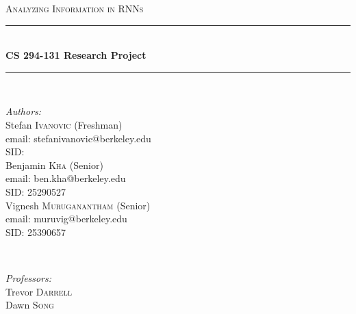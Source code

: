 \begin{titlepage}

\newcommand{\HRule}{\rule{\linewidth}{0.5mm}} %

\center %
 

\textsc{\LARGE Analyzing Information in RNNs}\\[0.5cm] %


\HRule \\[0.4cm]
{ \huge \bfseries CS 294-131 Research Project}\\[0.4cm] %
\HRule \\[1.5cm]
 

\begin{minipage}{0.5\textwidth}
\begin{flushleft} \large
\emph{Authors:}\\
Stefan \textsc{Ivanovic} (Freshman) \\%
email: stefanivanovic@berkeley.edu\\
SID: \\
\bigskip
Benjamin \textsc{Kha} (Senior) \\%
email: ben.kha@berkeley.edu\\
SID: 25290527\\
\bigskip
Vignesh \textsc{Muruganantham} (Senior) \\%
email: muruvig@berkeley.edu\\
SID: 25390657\\
\end{flushleft}
\end{minipage}
~
\begin{minipage}{0.4\textwidth}
\begin{flushright} \large
\emph{Professors:} \\
Trevor \textsc{Darrell} \\%
Dawn \textsc{Song} \\%
\end{flushright}
\end{minipage}\\[2cm]


\end{titlepage}
